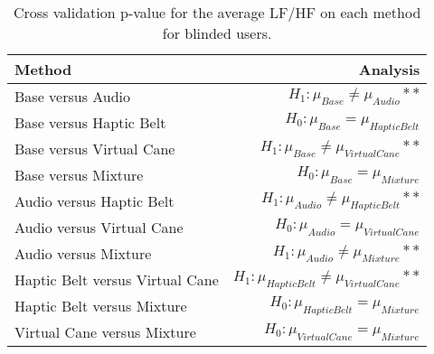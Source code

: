 
\begin{table}[!htb]
\centering
\caption{Cross validation p-value for the average LF/HF on each method for blinded users.}
\label{tab:lsd_average_lfhf}
\begin{tabular}{lr}
\toprule
                         Method &                                           Analysis \\
\midrule
              Base versus Audio &               $H_1 : \mu_{Base} \ne \mu_{Audio}**$ \\
        Base versus Haptic Belt &             $H_0 : \mu_{Base} = \mu_{Haptic Belt}$ \\
       Base versus Virtual Cane &        $H_1 : \mu_{Base} \ne \mu_{Virtual Cane}**$ \\
            Base versus Mixture &                 $H_0 : \mu_{Base} = \mu_{Mixture}$ \\
       Audio versus Haptic Belt &        $H_1 : \mu_{Audio} \ne \mu_{Haptic Belt}**$ \\
      Audio versus Virtual Cane &           $H_0 : \mu_{Audio} = \mu_{Virtual Cane}$ \\
           Audio versus Mixture &            $H_1 : \mu_{Audio} \ne \mu_{Mixture}**$ \\
Haptic Belt versus Virtual Cane & $H_1 : \mu_{Haptic Belt} \ne \mu_{Virtual Cane}**$ \\
     Haptic Belt versus Mixture &          $H_0 : \mu_{Haptic Belt} = \mu_{Mixture}$ \\
    Virtual Cane versus Mixture &         $H_0 : \mu_{Virtual Cane} = \mu_{Mixture}$ \\
\bottomrule
\end{tabular}
\end{table}

